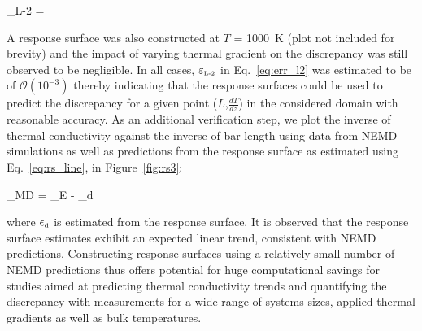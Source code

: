  \be
 \varepsilon_{\tiny{\mbox{L-2}}} =  
 \label{eq:err_l2}
 \ee
 
 A response surface was also constructed at $T$ = 1000~K (plot not included for brevity) and the impact of
 varying thermal gradient on the discrepancy was still observed to be negligible. In all cases,
 $\varepsilon_{\tiny{\mbox{L-2}}}$ in Eq.~\ref{eq:err_l2} was estimated to be of $\mathcal{O}(10^{-3})$ thereby
 indicating that the response surfaces could be used to predict the discrepancy for a given
 point ($L$,$\frac{dT}{dz}$) in the considered domain with reasonable accuracy. As an additional verification
 step, we plot the inverse of thermal conductivity against the inverse of bar length using data from NEMD
 simulations as well as predictions from the response surface as estimated using Eq.~\ref{eq:rs_line}, 
 in Figure~\ref{fig:rs3}:
 
 \be
\kappa_{\mbox{\tiny{MD}}} =  \kappa_{\mbox{\tiny{E}}} - \epsilon_{\mbox{\tiny{d}}} 
 \label{eq:rs_line}
 \ee
 
 \noindent where $\epsilon_{\mbox{\tiny{d}}}$ is estimated from the response surface. 
 It is observed that the response surface estimates exhibit an expected linear trend, consistent with NEMD
  predictions. Constructing response surfaces using a relatively small number of NEMD predictions thus offers
  potential for huge computational savings for studies aimed at predicting thermal conductivity trends and 
  quantifying the discrepancy with measurements for a wide range of systems sizes, applied thermal gradients as 
  well as bulk temperatures. 
 




































